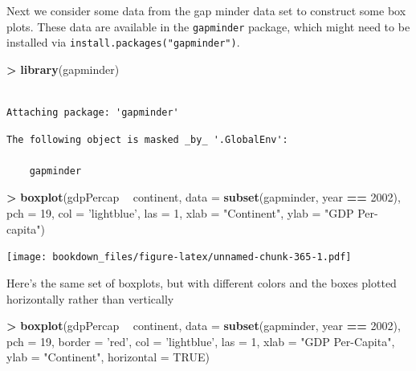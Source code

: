 \documentclass[]{krantz}
\makeatletter
\newenvironment{Shaded}{\begin{snugshade}}{\end{snugshade}}
\newcommand{\KeywordTok}[1]{\textcolor[rgb]{0.27,0.27,0.27}{\textbf{#1}}}
\newcommand{\DataTypeTok}[1]{\textcolor[rgb]{0.27,0.27,0.27}{#1}}
\newcommand{\DecValTok}[1]{\textcolor[rgb]{0.06,0.06,0.06}{#1}}
\newcommand{\StringTok}[1]{\textcolor[rgb]{0.5,0.5,0.5}{#1}}
\newcommand{\OtherTok}[1]{\textcolor[rgb]{0.37,0.37,0.37}{#1}}
\newcommand{\OperatorTok}[1]{\textcolor[rgb]{0.43,0.43,0.43}{\textbf{#1}}}
\newcommand{\NormalTok}[1]{#1}
\newenvironment{kframe}{%
\medskip{}
\setlength{\fboxsep}{.8em}
 \def\at@end@of@kframe{}%
 \ifinner\ifhmode%
  \def\at@end@of@kframe{\end{minipage}}%
  \begin{minipage}{\columnwidth}%
 \fi\fi%
 \def\FrameCommand##1{\hskip\@totalleftmargin \hskip-\fboxsep
 \colorbox{shadecolor}{##1}\hskip-\fboxsep
     \hskip-\linewidth \hskip-\@totalleftmargin \hskip\columnwidth}%
 \MakeFramed {\advance\hsize-\width
   \@totalleftmargin\z@ \linewidth\hsize
   \@setminipage}}%
 {\par\unskip\endMakeFramed%
 \at@end@of@kframe}
\renewenvironment{Shaded}{\begin{kframe}}{\end{kframe}}
\makeatother
\begin{document}
Next we consider some data from the gap minder data set to construct
some box plots. These data are available in the \texttt{gapminder}
package, which might need to be installed via
\texttt{install.packages("gapminder")}.

\begin{Shaded}
\begin{Highlighting}[]
\OperatorTok{>}\StringTok{ }\KeywordTok{library}\NormalTok{(gapminder)}
\end{Highlighting}
\end{Shaded}

\begin{verbatim}

Attaching package: 'gapminder'
\end{verbatim}

\begin{verbatim}
The following object is masked _by_ '.GlobalEnv':

    gapminder
\end{verbatim}

\begin{Shaded}
\begin{Highlighting}[]
\OperatorTok{>}\StringTok{ }\KeywordTok{boxplot}\NormalTok{(gdpPercap }\OperatorTok{~}\StringTok{ }\NormalTok{continent, }\DataTypeTok{data =} \KeywordTok{subset}\NormalTok{(gapminder, year }\OperatorTok{==}\StringTok{ }\DecValTok{2002}\NormalTok{), }\DataTypeTok{pch =} \DecValTok{19}\NormalTok{, }\DataTypeTok{col =} \StringTok{'lightblue'}\NormalTok{, }\DataTypeTok{las =} \DecValTok{1}\NormalTok{, }\DataTypeTok{xlab =} \StringTok{"Continent"}\NormalTok{, }\DataTypeTok{ylab =} \StringTok{"GDP Per-capita"}\NormalTok{)}
\end{Highlighting}
\end{Shaded}

\texttt{[image: bookdown\_files/figure-latex/unnamed-chunk-365-1.pdf]}

Here's the same set of boxplots, but with different colors and the boxes
plotted horizontally rather than vertically

\begin{Shaded}
\begin{Highlighting}[]
\OperatorTok{>}\StringTok{ }\KeywordTok{boxplot}\NormalTok{(gdpPercap }\OperatorTok{~}\StringTok{ }\NormalTok{continent, }\DataTypeTok{data =} \KeywordTok{subset}\NormalTok{(gapminder, year }\OperatorTok{==}\StringTok{ }\DecValTok{2002}\NormalTok{), }\DataTypeTok{pch =} \DecValTok{19}\NormalTok{, }\DataTypeTok{border =} \StringTok{'red'}\NormalTok{, }\DataTypeTok{col =} \StringTok{'lightblue'}\NormalTok{, }\DataTypeTok{las =} \DecValTok{1}\NormalTok{, }\DataTypeTok{xlab =} \StringTok{"GDP Per-Capita"}\NormalTok{, }\DataTypeTok{ylab =} \StringTok{"Continent"}\NormalTok{, }\DataTypeTok{horizontal =} \OtherTok{TRUE}\NormalTok{)}
\end{Highlighting}
\end{Shaded}
\end{document}

